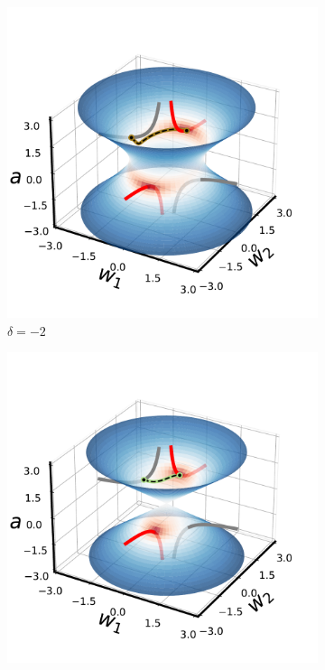 \documentclass{article}
\theoremstyle{plain}
\theoremstyle{definition}
\theoremstyle{remark}
\begin{document}
\begin{figure}
    \vspace{-10pt}
    \begin{subfigure}{0.325\linewidth}
        \centering
        \includegraphics[width=\linewidth]{fig/single-neuron/negative.pdf}
        \caption{$\delta = -2$}
    \end{subfigure}
    \begin{subfigure}{0.325\linewidth}
        \centering
        \includegraphics[width=\linewidth]{fig/single-neuron/zero.pdf}

\end{subfigure}
\end{figure}
\end{document}
